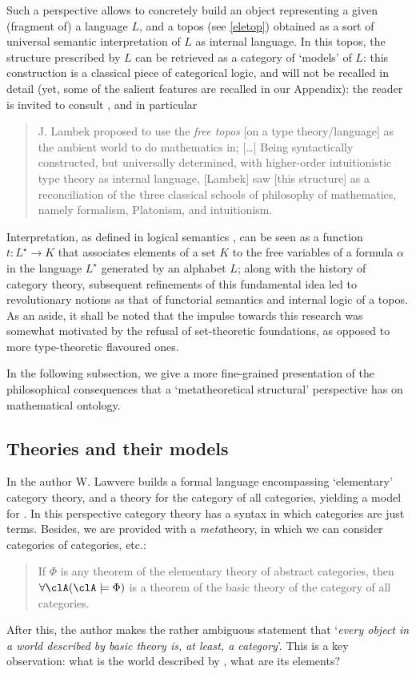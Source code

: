 Such a perspective allows to concretely build an object representing a given (fragment of) a language $L$, and a topos (see \autoref{eletop}) obtained as a sort of universal semantic interpretation of $L$ as internal language. In this topos, the structure prescribed by $L$ can be retrieved as a category of `models' of $L$: this construction is a classical piece of categorical logic, and will not be recalled in detail (yet, some of the salient features are recalled in our Appendix): the reader is invited to consult \cite[II.12, 13, 14]{lambek1988introduction}, and in particular
\begin{quote}
    J. Lambek proposed to use the \emph{free topos} [on a type theory/language] as the ambient world to do mathematics in; [\dots\unkern] Being syntactically constructed, but universally determined, with higher-order intuitionistic type theory as internal language, [Lambek] saw [this structure] as a reconciliation of the three classical schools of philosophy of mathematics, namely formalism, Platonism, and intuitionism. \hfill\cite{free_topos}
\end{quote}
Interpretation, as defined in logical semantics \cite{gamut1991logic}, can be seen as a function $t: L^\star \to K$ that associates elements of a set $K$ to the free variables of a formula $\alpha$ in the language $L^\star$ generated by an alphabet $L$; along with the history of category theory, subsequent refinements of this fundamental idea led to revolutionary notions as that of functorial semantics and internal logic of a topos.
As an aside, it shall be noted that the impulse towards this research was somewhat motivated by the refusal of set-theoretic foundations, as opposed to more type-theoretic flavoured ones.

In the following subsection, we give a more fine-grained presentation of the philosophical consequences that a `metatheoretical structural' perspective has on mathematical ontology.
\subsection{Theories and their models}
In \cite{lajolla} the author W. Lawvere builds a formal language  encompassing `elementary' category theory, and a theory  for the category of all categories, yielding a model for . In this perspective category theory has a syntax in which categories are just terms. Besides, we are provided with a \emph{meta}theory, in which we can consider categories of categories, etc.:
\begin{quote}
    If $\Phi$ is any theorem of the elementary theory of abstract categories, then $\forall \clA (\clA \models \Phi)$ is a theorem of the basic theory of the category of all categories. \hfill \cite{lajolla}
\end{quote}
After this, the author makes the rather ambiguous statement that `\textit{every object in a world described by basic theory is, at least, a category}'. This is a key observation: what is the world described by , what are its elements?

